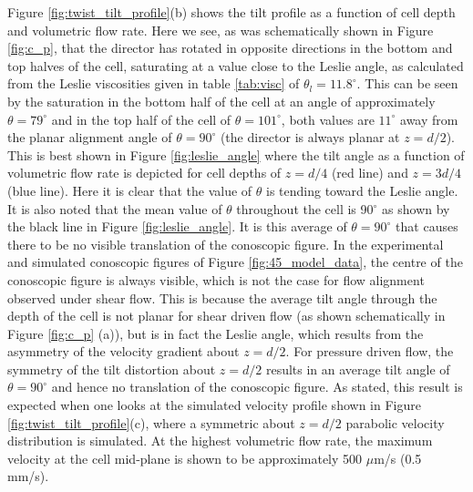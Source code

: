 Figure \ref{fig:twist_tilt_profile}(b) shows the tilt profile as a function of cell depth and volumetric flow rate. Here we see, as was schematically shown in Figure \ref{fig:c_p}, that the director has rotated in opposite directions in the bottom and top halves of the cell, saturating at a value close to the Leslie angle, as calculated from the Leslie viscosities given in table \ref{tab:visc} of $\theta_l=11.8^{\circ}$. This can be seen by the saturation in the bottom half of the cell at an angle of approximately $\theta=79^{\circ}$ and in the top half of the cell of $\theta=101^{\circ}$, both values are $11^{\circ}$ away from the planar alignment angle of $\theta=90^{\circ}$ (the director is always planar at $z=d/2$). This is best shown in Figure \ref{fig:leslie_angle} where the tilt angle as a function of volumetric flow rate is depicted for cell depths of $z=d/4$ (red line) and $z=3d/4$ (blue line). Here it is clear that the value of $\theta$ is tending toward the Leslie angle. It is also noted that the mean value of $\theta$ throughout the cell is 90$^{\circ}$ as shown by the black line in Figure \ref{fig:leslie_angle}. It is this average of $\theta=90^{\circ}$ that causes there to be no visible translation of the conoscopic figure. In the experimental and simulated conoscopic figures of Figure \ref{fig:45_model_data}, the centre of the conoscopic figure is always visible, which is not the case for flow alignment observed under shear flow. This is because the average tilt angle through the depth of the cell is not planar for shear driven flow (as shown schematically in Figure \ref{fig:c_p} (a)), but is in fact the Leslie angle, which results from the asymmetry of the velocity gradient about $z=d/2$. For pressure driven flow, the symmetry of the tilt distortion about $z=d/2$ results in an average tilt angle of $\theta=90^{\circ}$ and hence no translation of the conoscopic figure. As stated, this result is expected when one looks at the simulated velocity profile shown in Figure \ref{fig:twist_tilt_profile}(c), where a symmetric about $z=d/2$ parabolic velocity distribution is simulated. At the highest volumetric flow rate, the maximum velocity at the cell mid-plane is shown to be approximately 500 $\mu$m/s (0.5 mm/s).

